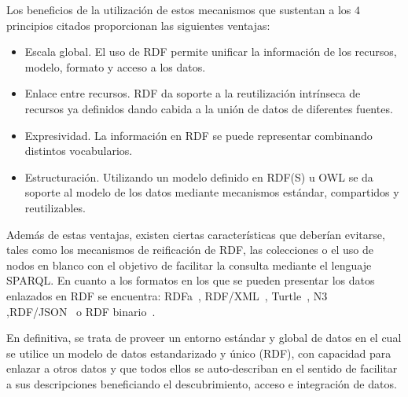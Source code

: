 Los beneficios de la utilización de estos mecanismos que sustentan a los $4$ principios citados proporcionan las siguientes ventajas:
\begin{itemize}
 \item Escala global. El uso de \gls{RDF} permite unificar la información de los recursos, modelo, formato y acceso a los datos.
 \item Enlace entre recursos. RDF da soporte a la reutilización intrínseca de recursos ya definidos dando cabida
a la unión de datos de diferentes fuentes.
  \item Expresividad. La información en RDF se puede representar combinando distintos vocabularios.
 \item Estructuración. Utilizando un modelo definido en RDF(S) u \gls{OWL} se da soporte al modelo de los datos
mediante mecanismos estándar, compartidos y reutilizables.
\end{itemize}

Además de estas ventajas, existen ciertas características que deberían evitarse, tales como los mecanismos
de reificación de RDF, las colecciones o el uso de nodos en blanco con el objetivo de facilitar la consulta
mediante el lenguaje SPARQL. En cuanto a los formatos en los que se pueden presentar los datos enlazados en RDF se encuentra:
\gls{RDFa}~\cite{rdfa-primer}, \gls{RDF/XML}~\cite{rdf-syntax}, \gls{Turtle}~\cite{turtle-syntax}, \gls{N3}~\cite{n3-syntax} ,\gls{RDF}/\gls{JSON}~\cite{rdf-binario} o RDF binario~\cite{rdf-json}.


En definitiva, se trata de proveer un entorno estándar y global de datos en el cual se utilice un modelo
de datos estandarizado y único (RDF), con capacidad para enlazar a otros datos y que todos ellos se auto-describan
en el sentido de facilitar a sus descripciones beneficiando el descubrimiento, acceso e integración de datos.

